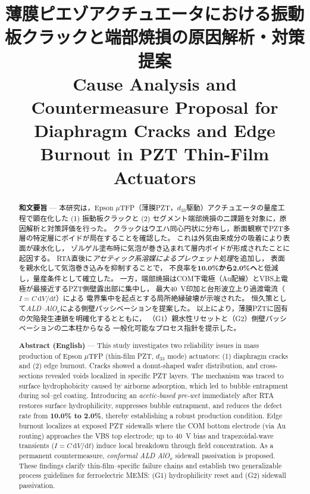 \documentclass[conference]{IEEEtran}
\title{%
  薄膜ピエゾアクチュエータにおける振動板クラックと端部焼損の原因解析・対策提案\\
  \large Cause Analysis and Countermeasure Proposal for Diaphragm Cracks and Edge Burnout in PZT Thin-Film Actuators
}
\author{%
  \IEEEauthorblockN{三溝 真一 (Shinichi Samizo)}%
  \IEEEauthorblockA{独立系半導体研究者（元セイコーエプソン） / Independent Semiconductor Researcher (ex-Seiko Epson)\\%
  Email: \href{mailto:shin3t72@gmail.com}{shin3t72@gmail.com}\quad
  GitHub: \url{https://github.com/Samizo-AITL}}%
}
\begin{document}
\maketitle

\begin{abstract}
\textbf{和文要旨} —
本研究は，Epson $\mu$TFP（薄膜PZT，$d_{33}$駆動）アクチュエータの量産工程で顕在化した
(1) 振動板クラックと (2) セグメント端部焼損の二課題を対象に，原因解析と対策評価を行った。
クラックはウエハ同心円状に分布し，断面観察でPZT多層の特定層にボイドが局在することを確認した。
これは外気由来成分の吸着により表面が疎水化し，
ゾルゲル塗布時に気泡が巻き込まれて層内ボイドが形成されたことに起因する。
RTA直後に\emph{アセティック系溶媒によるプレウェット処理}を追加し，
表面を親水化して気泡巻き込みを抑制することで，
不良率を\textbf{10.0\%から2.0\%へ}と低減し，量産条件として確立した。
一方，端部焼損はCOM下電極（Au配線）とVBS上電極が最接近するPZT側壁露出部に集中し，
最大\SI{40}{V}印加と台形波立上り過渡電流（$I=C\,\mathrm{d}V/\mathrm{d}t$）による
電界集中を起点とする局所絶縁破壊が示唆された。
恒久策として\emph{ALD–AlO$_x$}による側壁パッシベーションを提案した。
以上により，薄膜PZTに固有の欠陥発生連鎖を明確化するとともに，
（G1）親水性リセットと（G2）側壁パッシベーションの二本柱からなる
一般化可能なプロセス指針を提示した。

\medskip
\textbf{Abstract (English)} —
This study investigates two reliability issues in mass production of Epson $\mu$TFP
(thin-film PZT, $d_{33}$ mode) actuators: (1) diaphragm cracks and (2) edge burnout.
Cracks showed a donut-shaped wafer distribution, and cross-sections revealed voids localized
in specific PZT layers. The mechanism was traced to surface hydrophobicity caused by
airborne adsorption, which led to bubble entrapment during sol–gel coating.
Introducing an \emph{acetic-based pre-wet} immediately after RTA restores surface hydrophilicity,
suppresses bubble entrapment, and reduces the defect rate from \textbf{10.0\% to 2.0\%},
thereby establishing a robust production condition.
Edge burnout localizes at exposed PZT sidewalls where the COM bottom electrode
(via Au routing) approaches the VBS top electrode; up to \SI{40}{V} bias and trapezoidal-wave
transients ($I=C\,\mathrm{d}V/\mathrm{d}t$) induce local breakdown through field concentration.
As a permanent countermeasure, \emph{conformal ALD AlO$_x$} sidewall passivation is proposed.
These findings clarify thin-film–specific failure chains and establish two generalizable
process guidelines for ferroelectric MEMS: (G1) hydrophilicity reset and (G2) sidewall passivation.
\end{abstract}
\end{document}
